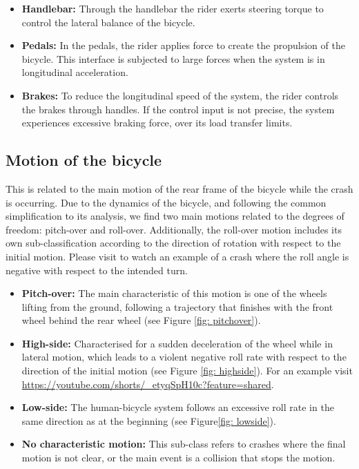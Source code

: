 \documentclass{article}
\begin{document}
\begin{itemize}
    \item \textbf{Handlebar:} Through the handlebar the rider exerts steering torque to control the lateral balance of the bicycle.
    \item \textbf{Pedals:} In the pedals, the rider applies force to create the propulsion of the bicycle.
        This interface is subjected to large forces when the system is in longitudinal acceleration.
    \item \textbf{Brakes:} To reduce the longitudinal speed of the system, the rider controls the brakes through handles.
        If the control input is not precise, the system experiences excessive braking force, over its load transfer limits.
\end{itemize}


\subsection{Motion of the bicycle}

This is related to the main motion of the rear frame of the bicycle while the crash is occurring.
%
Due to the dynamics of the bicycle, and following the common simplification to its analysis, we find two main motions related to the degrees of freedom: pitch-over and roll-over.
%
Additionally, the roll-over motion includes its own sub-classification according to the direction of rotation with respect to the initial motion.
% 
Please visit  to watch an example of a crash where the roll angle is negative with respect to the intended turn.


\begin{itemize}
    \item \textbf{Pitch-over:} The main characteristic of this motion is one of the wheels lifting from the ground, following a trajectory that finishes with the front wheel behind the rear wheel (see Figure \ref{fig: pitchover}).
    \item \textbf{High-side:} Characterised for a sudden deceleration of the wheel while in lateral motion, which leads to a violent negative roll rate with respect to the direction of the initial motion (see Figure \ref{fig: highside}).
        For an example visit \url{https://youtube.com/shorts/_etyqSpH10c?feature=shared}.
    \item \textbf{Low-side:} The human-bicycle system follows an excessive roll rate in the same direction as at the beginning (see Figure\ref{fig: lowside}).
    \item \textbf{No characteristic motion:} This sub-class refers to crashes where the final motion is not clear, or the main event is a collision that stops the motion.
\end{itemize}
\end{document}
